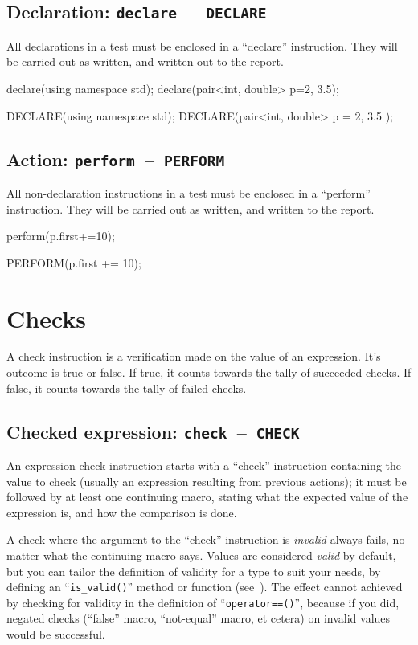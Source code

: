 \documentclass[twoside, a4paper, article]{memoir}
\newcommand*\testudocolor{\color{red!80!blue}}
\newcommand*\testudo[1]{\texttt{\testudocolor{}#1}}
\newcommand*\testudopair[2]{\testudo{#1}~--~\testudo{#2}}
\newcommand\subsectiontestudopair[3]{%
  \subsection[#1]{#1: \testudopair{#2}{#3}}}
\begin{document}
\subsectiontestudopair{Declaration}{declare}{DECLARE}
\label{sec:declaration}

All declarations in a test must be enclosed in a ``declare'' instruction.  They
will be carried out as written, and written out to the report.
\begin{cpplisting}
declare(using namespace std);
declare(pair<int, double> p={2, 3.5});
\end{cpplisting}

\begin{cpplisting}
DECLARE(using namespace std);
DECLARE(pair<int, double> p = { 2, 3.5 });
\end{cpplisting}

\subsectiontestudopair{Action}{perform}{PERFORM}
\label{sec:action}

All non-declaration instructions in a test must be enclosed in a ``perform''
instruction.  They will be carried out as written, and written to the report.
\begin{cpplisting}
perform(p.first+=10);
\end{cpplisting}

\begin{cpplisting}
PERFORM(p.first += 10);
\end{cpplisting}


\section{Checks}
\label{sec:checks}

A check instruction is a verification made on the value of an expression.  It's
outcome is true or false.  If true, it counts towards the tally of succeeded
checks.  If false, it counts towards the tally of failed checks.

\subsectiontestudopair{Checked expression}{check}{CHECK}
\label{sec:checked-expression}

An expression-check instruction starts with a ``check'' instruction containing
the value to check (usually an expression resulting from previous actions); it
must be followed by at least one continuing macro, stating what the expected
value of the expression is, and how the comparison is done.

A check where the argument to the ``check'' instruction is \emph{invalid}
always fails, no matter what the continuing macro says.  Values are considered
\emph{valid} by default, but you can tailor the definition of validity for a
type to suit your needs, by defining an ``\texttt{is\_valid()}'' method or
function (see~).  The effect cannot achieved by checking for
validity in the definition of ``\texttt{operator==()}'', because if you did,
negated checks (``false'' macro, ``not-equal'' macro, et cetera) on invalid
values would be successful.
\end{document}
